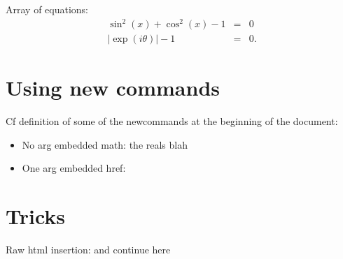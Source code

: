 Array of equations:
\begin{eqnarray}
    \sin^2(x)+\cos^2(x) - 1 &=& 0\nonumber\\
    |\exp(i\theta)|-1 &=& 0.
\end{eqnarray}

\section{\label{sec:newcom}Using new commands}
Cf definition of some of the newcommands at the beginning of the document:
\begin{itemize}
    \item No arg embedded math: the reals \RR blah
    \item One arg embedded href: 
\end{itemize}

\section{Tricks}
Raw html insertion:
and continue here



